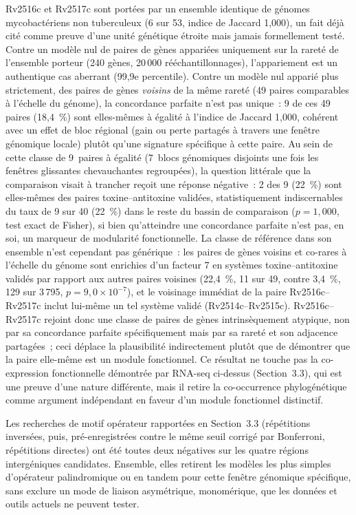 \documentclass[11pt,a4paper]{article}
\begin{document}
Rv2516c et Rv2517c sont portées par un ensemble identique de génomes mycobactériens non
tuberculeux (6 sur 53, indice de Jaccard 1,000), un fait déjà cité comme preuve d'une unité
génétique étroite mais jamais formellement testé. Contre un modèle nul de paires de gènes appariées
uniquement sur la rareté de l'ensemble porteur (240 gènes, 20\,000 rééchantillonnages),
l'appariement est un authentique cas aberrant (99,9e percentile). Contre un modèle nul apparié plus
strictement, des paires de gènes \emph{voisins} de la même rareté (49 paires comparables à l'échelle
du génome), la concordance parfaite n'est pas unique~: 9 de ces 49 paires (18,4~\%) sont elles-mêmes
à égalité à l'indice de Jaccard 1,000, cohérent avec un effet de bloc régional (gain ou perte
partagés à travers une fenêtre génomique locale) plutôt qu'une signature spécifique à cette paire.
Au sein de cette classe de 9~paires à égalité (7~blocs génomiques disjoints une fois les fenêtres
glissantes chevauchantes regroupées), la question littérale que la comparaison visait à trancher
reçoit une réponse négative~: 2 des 9 (22~\%) sont elles-mêmes des paires toxine--antitoxine
validées, statistiquement indiscernables du taux de 9 sur 40 (22~\%) dans le reste du bassin de
comparaison ($p=1,000$, test exact de Fisher), si bien qu'atteindre une concordance parfaite n'est
pas, en soi, un marqueur de modularité fonctionnelle. La classe de référence dans son ensemble n'est
cependant pas générique~: les paires de gènes voisins et co-rares à l'échelle du génome sont
enrichies d'un facteur 7 en systèmes toxine--antitoxine validés par rapport aux autres paires
voisines (22,4~\%, 11 sur 49, contre 3,4~\%, 129 sur 3\,795, $p=9,0\times10^{-7}$), et le voisinage
immédiat de la paire Rv2516c--Rv2517c inclut lui-même un tel système validé (Rv2514c--Rv2515c).
Rv2516c--Rv2517c rejoint donc une classe de paires de gènes intrinsèquement atypique, non par sa
concordance parfaite spécifiquement mais par sa rareté et son adjacence partagées~; ceci déplace la
plausibilité indirectement plutôt que de démontrer que la paire elle-même est un module fonctionnel.
Ce résultat ne touche pas la co-expression fonctionnelle démontrée par RNA-seq ci-dessus
(Section~3.3), qui est une preuve d'une nature différente, mais il retire la co-occurrence
phylogénétique comme argument indépendant en faveur d'un module fonctionnel distinctif.

Les recherches de motif opérateur rapportées en Section~3.3 (répétitions inversées, puis,
pré-enregistrées contre le même seuil corrigé par Bonferroni, répétitions directes) ont été toutes
deux négatives sur les quatre régions intergéniques candidates. Ensemble, elles retirent les
modèles les plus simples d'opérateur palindromique ou en tandem pour cette fenêtre génomique
spécifique, sans exclure un mode de liaison asymétrique, monomérique, que les données et outils
actuels ne peuvent tester.
\end{document}
